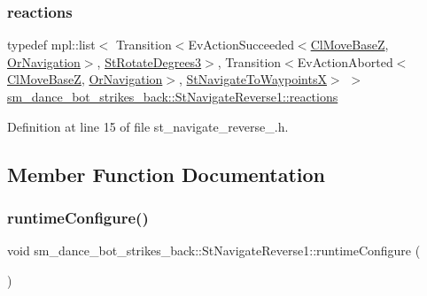 \subsubsection{\texorpdfstring{reactions}{reactions}}
{\footnotesize\ttfamily typedef mpl\+::list$<$ Transition$<$Ev\+Action\+Succeeded$<$\hyperlink{classmove__base__z__client_1_1ClMoveBaseZ}{Cl\+Move\+BaseZ}, \hyperlink{classsm__dance__bot__strikes__back_1_1OrNavigation}{Or\+Navigation}$>$, \hyperlink{structsm__dance__bot__strikes__back_1_1StRotateDegrees3}{St\+Rotate\+Degrees3}$>$, Transition$<$Ev\+Action\+Aborted$<$\hyperlink{classmove__base__z__client_1_1ClMoveBaseZ}{Cl\+Move\+BaseZ}, \hyperlink{classsm__dance__bot__strikes__back_1_1OrNavigation}{Or\+Navigation}$>$, \hyperlink{structsm__dance__bot__strikes__back_1_1StNavigateToWaypointsX}{St\+Navigate\+To\+WaypointsX}$>$ $>$ \hyperlink{structsm__dance__bot__strikes__back_1_1StNavigateReverse1_a7afa44efa60577fcd041292001a09d9f}{sm\+\_\+dance\+\_\+bot\+\_\+strikes\+\_\+back\+::\+St\+Navigate\+Reverse1\+::reactions}}



Definition at line 15 of file st\+\_\+navigate\+\_\+reverse\+\_.\+h.



\subsection{Member Function Documentation}
\mbox{\label{structsm__dance__bot__strikes__back_1_1StNavigateReverse1_ab550267f2da431b8cf102c1257d911ae}} 
\subsubsection{\texorpdfstring{runtime\+Configure()}{runtimeConfigure()}}
{\footnotesize\ttfamily void sm\+\_\+dance\+\_\+bot\+\_\+strikes\+\_\+back\+::\+St\+Navigate\+Reverse1\+::runtime\+Configure (\begin{DoxyParamCaption}{ }\end{DoxyParamCaption})\hspace{0.3cm}{\ttfamily [inline]}}



